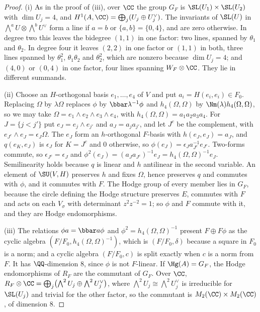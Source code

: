 \begin{proof}
(i) As in the proof of (iii), over $\CC$ the group $G_{F}$
is $\SL(U_{1})\times\SL(U_{2})$ with $\dim U_{j}=4$, and
$H^{1}(A,\CC)=\bigoplus_{j}(U_{j}\oplus U_{j}^{\vee})$. The invariants of
$\SL(U)$ in $\bigwedge^{a}U\otimes\bigwedge^{b}U^{\vee}$ form a line if $a=b$
or $\{a,b\}=\{0,4\}$, and are zero otherwise. In degree two this leaves the
bidegree $(1,1)$ in one factor: two lines, spanned by $\theta_{1}$ and
$\theta_{2}$. In degree four it leaves $(2,2)$ in one factor or $(1,1)$ in
both, three lines spanned by $\theta_{1}^{2}$, $\theta_{1}\theta_{2}$ and
$\theta_{2}^{2}$, which are nonzero because $\dim U_{j}=4$; and $(4,0)$ or
$(0,4)$ in one factor, four lines spanning $W_{F}\otimes\CC$. They lie in
different summands.

(ii) Choose an $H$-orthogonal basis $e_{1},\dots,e_{4}$ of $V$ and put
$a_{i}=H(e_{i},e_{i})\in F_{0}$. Replacing $\Omega$ by $\lambda\Omega$
replaces $\phi$ by $\bbar\lambda^{-1}\phi$ and $h_{4}(\Omega,\Omega)$ by
$\Nm(\lambda)h_{4}(\Omega,\Omega)$, so we may take
$\Omega=e_{1}\wedge e_{2}\wedge e_{3}\wedge e_{4}$, with
$h_{4}(\Omega,\Omega)=a_{1}a_{2}a_{3}a_{4}$. For $J=\{j<j'\}$ put
$e_{J}=e_{j}\wedge e_{j'}$ and $a_{J}=a_{j}a_{j'}$, and let $J^{c}$ be the
complement, with $e_{J^{c}}\wedge e_{J}=\epsilon_{J}\Omega$. The $e_{J}$ form
an $h$-orthogonal $F$-basis with $h(e_{J},e_{J})=a_{J}$, and
$q(e_{K},e_{J})$ is $\epsilon_{J}$ for $K=J^{c}$ and $0$ otherwise, so
$\phi(e_{J})=\epsilon_{J}a_{J^{c}}^{-1}e_{J^{c}}$. Two-forms commute, so
$\epsilon_{J^{c}}=\epsilon_{J}$ and
$\phi^{2}(e_{J})=(a_{J}a_{J^{c}})^{-1}e_{J}=h_{4}(\Omega,\Omega)^{-1}e_{J}$.
Semilinearity holds because $q$ is linear and $h$ antilinear in the second
variable. An element of $\SU(V,H)$ preserves $h$ and fixes $\Omega$, hence
preserves $q$ and commutes with $\phi$, and it commutes with $F$. The Hodge
group of every member lies in $G_{F}$, because the circle defining the Hodge
structure preserves $E$, commutes with $F$ and acts on each $V_{\sigma}$ with
determinant $z^{2}z^{-2}=1$; so $\phi$ and $F$ commute with it, and they are
Hodge endomorphisms.

(iii) The relations $\phi a=\bbar a\phi$ and $\phi^{2}=h_{4}(\Omega,\Omega)^{-1}$
present $F\oplus F\phi$ as the cyclic algebra
$(F/F_{0},h_{4}(\Omega,\Omega)^{-1})$, which is $(F/F_{0},\delta)$ because a
square in $F_{0}$ is a norm; and a cyclic algebra $(F/F_{0},c)$ is split
exactly when $c$ is a norm from $F$. It has $\QQ$-dimension $8$, since $\phi$
is not $F$-linear. If $\Hg(A)=G_{F}$, the Hodge endomorphisms of $R_{F}$ are
the commutant of $G_{F}$. Over $\CC$,
$R_{F}\otimes\CC=\bigoplus_{j}\bigl(\bigwedge^{2}U_{j}\oplus
\bigwedge^{2}U_{j}^{\vee}\bigr)$, where
$\bigwedge^{2}U_{j}\cong\bigwedge^{2}U_{j}^{\vee}$ is irreducible for
$\SL(U_{j})$ and trivial for the other factor, so the commutant is
$M_{2}(\CC)\times M_{2}(\CC)$, of dimension $8$.


\end{proof}
